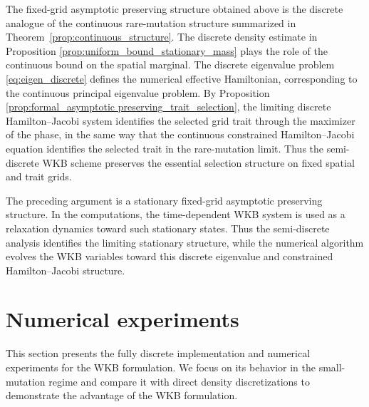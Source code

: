 \documentclass[11pt]{article}
\begin{document}
The fixed-grid asymptotic preserving structure obtained above is the discrete analogue of the
continuous rare-mutation structure summarized in
Theorem~\ref{prop:continuous_structure}.  The discrete density estimate in Proposition \ref{prop:uniform_bound_stationary_mass}
plays the role of the continuous bound on the spatial marginal.  The discrete
eigenvalue problem \eqref{eq:eigen_discrete} defines the numerical effective Hamiltonian, corresponding
to the continuous principal eigenvalue problem.  
By Proposition \ref{prop:formal_asymptotic preserving_trait_selection}, the limiting discrete
Hamilton--Jacobi system identifies the selected grid trait through the maximizer
of the phase, in the same way that the continuous constrained
Hamilton--Jacobi equation identifies the selected trait in the rare-mutation
limit.  Thus the semi-discrete WKB scheme preserves the essential selection
structure on fixed spatial and trait grids.








The preceding argument is a stationary fixed-grid asymptotic preserving structure.  In the
computations, the time-dependent WKB system is used as a relaxation dynamics
toward such stationary states.  Thus the semi-discrete analysis identifies the
limiting stationary structure, while the numerical algorithm evolves the WKB
variables toward this discrete eigenvalue and constrained Hamilton--Jacobi
structure.













\section{Numerical experiments}\label{sec:numerics}

This section presents the fully discrete implementation and numerical
experiments for the WKB formulation.  We focus on its behavior in the
small-mutation regime and compare it with direct density discretizations to
demonstrate the advantage of the WKB formulation.
\end{document}
